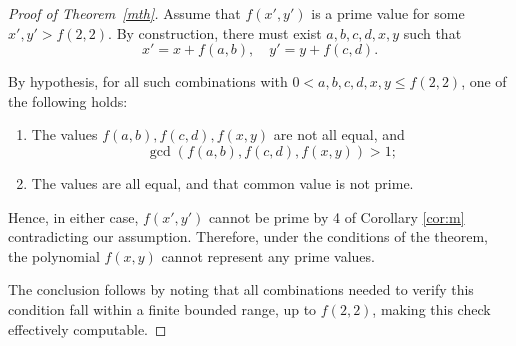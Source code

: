 \documentclass[10pt,a4paper]{amsart}
\begin{document}
	\begin{proof}[Proof of Theorem~\ref{mth}]
		Assume that $f(x', y')$ is a prime value for some $x', y' > f(2, 2)$. By construction, there must exist $a, b, c, d, x, y$ such that
		\[
		x' = x + f(a, b), \quad y' = y + f(c, d).
		\]
		
		By hypothesis, for all such combinations with $0 < a, b, c, d, x, y \leq f(2, 2)$, one of the following holds:
		\begin{enumerate}
			\item The values $f(a, b), f(c, d), f(x, y)$ are not all equal, and
			\[
			\gcd(f(a, b), f(c, d), f(x, y)) > 1;
			\]
			\item The values are all equal, and that common value is not prime.
		\end{enumerate}
		
		Hence, in either case, $f(x', y')$ cannot be prime by 4 of Corollary \ref{cor:m} contradicting our assumption. Therefore, under the conditions of the theorem, the polynomial $f(x, y)$ cannot represent any prime values.
		
		The conclusion follows by noting that all combinations needed to verify this condition fall within a finite bounded range, up to $f(2, 2)$, making this check effectively computable.
	\end{proof}
\end{document}
